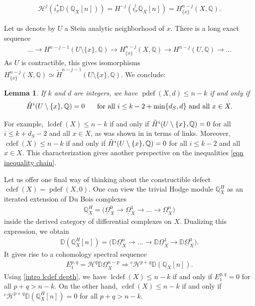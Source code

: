 \documentclass[11pt]{amsart}
\newtheorem{lemma}[equation]{Lemma}
\theoremstyle{definition}
\theoremstyle{plain}
\newcounter{intro}
\DeclareMathOperator{\lcdef}{lcdef}
\DeclareMathOperator{\cdef}{cdef}
\DeclareMathOperator{\pdef}{pdef}
\begin{document}
\begin{align*}
    \mathcal{H}^j (i_x^* \mathbb{D}(\mathbb{Q}_X[n])) = H^{-j}(i_x^! \mathbb{Q}_X[n]) = H^{n-j}_{\{x\}}(X, \mathbb{Q}).
\end{align*}

Let us denote by $U$ a Stein analytic neighborhood of $x$. There is a long exact sequence
\begin{align*}
    \ldots \rightarrow H^{n-j-1}(U \setminus \{ x \}, \mathbb{Q}) \rightarrow H^{n-j}_{\{x\}}(X, \mathbb{Q}) \rightarrow H^{n-j}(U, \mathbb{Q}) \rightarrow \ldots 
\end{align*}
As $U$ is contractible, this gives isomorphisms $H^{n-j}_{\{x\}}(X, \mathbb{Q}) \simeq \tilde{H}^{n-j-1}(U \setminus \{ x\}, \mathbb{Q})$. We conclude:

\begin{lemma}\label{lemma link}
If $k$ and $d$ are integers, we have $\pdef(X, d) \leq n - k$ if and only if
\begin{align*}
    \Tilde{H}^i(U \setminus \{ x\}, \mathbb{Q}) = 0 \hspace{.5cm} \text{ for all } i \leq k-2 + \min \{ d_S, d\} \text{ and all } x \in X.
\end{align*}   
\end{lemma}
For example, $\lcdef(X) \leq n-k$ if and only if $\Tilde{H}^i(U \setminus \{ x\}, \mathbb{Q}) = 0$ for all $i \leq k+d_S-2$ and all $x \in X$, as was shown in \cite[Corollary $3$]{saito lcdef} in terms of links. Moreover, $\cdef(X) \leq n-k$ if and only if $\Tilde{H}^i(U \setminus \{ x\}, \mathbb{Q}) = 0$ for all $i \leq k-2$ and all $x \in X$. This characterization gives another perspective on the inequalities \ref{eqn inequality chain}.

Let us offer one final way of thinking about the constructible defect $\cdef(X) = \pdef(X,0)$. One can view the trivial Hodge module $\mathbb{Q}_X^H$ as an iterated extension of Du Bois complexes
\begin{align*}
    \mathbb{Q}_X^H = \bigg( \underline{\Omega}_X^0 \rightarrow \underline{\Omega}_X^1 \rightarrow \ldots \rightarrow \underline{\Omega}_X^n \bigg)
\end{align*}
inside the derived category of differential complexes on $X$. Dualizing this expression, we obtain
\begin{align*}
    \mathbb{D}( \mathbb{Q}_X^H[n] ) = \bigg( \mathbb{D} \underline{\Omega}_X^n \rightarrow \ldots \rightarrow \mathbb{D} \underline{\Omega}_X^1 \rightarrow \mathbb{D} \underline{\Omega}_X^0 \bigg).
\end{align*}
It gives rise to a cohomology spectral sequence
\begin{align*}
    E_1^{p,q} = \mathcal{H}^q \mathbb{D} \underline{\Omega}_X^{n-p} \Rightarrow {}^c \mathcal{H}^{p+q} \mathbb{D}(\mathbb{Q}_X[n]).
\end{align*}
Using \ref{intro lcdef depth}, we have $\lcdef(X) \leq n-k$ if and only if $E_1^{p,q} = 0$ for all $p+q > n-k$. On the other hand, $\cdef(X) \leq n-k$ if and only if ${}^c \mathcal{H}^{p+q} \mathbb{D}(\mathbb{Q}_X^H[n]) = 0$ for all $p+q>n-k$. 
\end{document}
